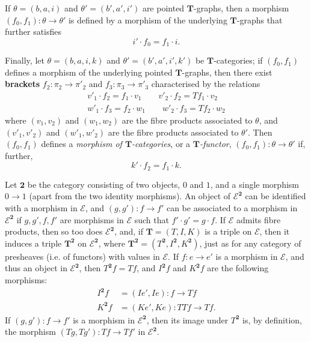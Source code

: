 \documentclass{article}
\newcommand{\oldpage}[1]{\marginpar{\footnotesize$\Big\vert$ \textit{p.~#1}}}
\newcommand{\unsure}[1]{{\color{purple}\textbf{#1}}}
\newcommand{\TT}{\mathbf{T}}
\newcommand{\cat}[1]{\mathcal{#1}}
\begin{document}
If $\theta=(b,a,i)$ and $\theta'=(b',a',i')$ are pointed $\TT$-graphs, then a morphism $(f_0,f_1)\colon\theta\to\theta'$ is defined by a morphism of the underlying $\TT$-graphs that further satisfies
\[
  i'\cdot f_0
  = f_1\cdot i.
  \tag{2'}
\]

\oldpage{228}
Finally, let $\theta=(b,a,i,k)$ and $\theta'=(b',a',i',k')$ be $\TT$-categories;
if $(f_0,f_1)$ defines a morphism of the underlying pointed $\TT$-graphs, then there exist \unsure{brackets} $f_2\colon\pi_2\to\pi'_2$ and $f_3\colon\pi_3\to\pi'_3$ characterised by the relations
\[
  \begin{gathered}
    v'_1\cdot f_2
    = f_1\cdot v_1
    \qquad
    v'_2\cdot f_2
    = Tf_1\cdot v_2
  \\w'_1\cdot f_3
    = f_2\cdot w_1
    \qquad
    w'_2\cdot f_3
    = T f_2\cdot w_2
  \end{gathered}
\]
where $(v_1,v_2)$ and $(w_1,w_2)$ are the fibre products associated to $\theta$, and $(v'_1,v'_2)$ and $(w'_1,w'_2)$ are the fibre products associated to $\theta'$.
Then $(f_0,f_1)$ defines a \emph{morphism of $\TT$-categories}, or a \emph{$\TT$-functor}, $(f_0,f_1)\colon\theta\to\theta'$ if, further,
\[
  k'\cdot f_2
  = f_1\cdot k.
  \tag{3'}
\]

Let $\mathbf{2}$ be the category consisting of two objects, $0$ and $1$, and a single morphism $0\to1$ (apart from the two identity morphisms).
An object of $\cat{E}^\mathbf{2}$ can be identified with a morphism in $\cat{E}$, and $(g,g')\colon f\to f'$ can be associated to a morphism in $\cat{E}^\mathbf{2}$ if $g,g',f,f'$ are morphisms in $\cat{E}$ such that $f'\cdot g'=g\cdot f$.
If $\cat{E}$ admits fibre products, then so too does $\cat{E}^\mathbf{2}$, and, if $\TT=(T,I,K)$ is a triple on $\cat{E}$, then it induces a triple $\TT^\mathbf{2}$ on $\cat{E}^\mathbf{2}$, where $\TT^\mathbf{2}=(T^\mathbf{2},I^\mathbf{2},K^\mathbf{2})$, just as for any category of presheaves (i.e. of functors) with values in $\cat{E}$.
If $f\colon e\to e'$ is a morphism in $\cat{E}$, and thus an object in $\cat{E}^\mathbf{2}$, then $T^\mathbf{2}f=Tf$, and $I^\mathbf{2}f$ and $K^\mathbf{2}f$ are the following morphisms:
\[
  \begin{aligned}
    I^\mathbf{2}f
    &= (Ie',Ie)
    \colon f
    \to Tf
  \\K^\mathbf{2}f
    &= (Ke', Ke)
    \colon TTf
    \to Tf.
  \end{aligned}
\]
If $(g,g')\colon f\to f'$ is a morphism in $\cat{E}^\mathbf{2}$, then its image under $T^\mathbf{2}$ is, by definition, the morphism $(Tg,Tg')\colon Tf\to Tf'$ in $\cat{E}^\mathbf{2}$.
\end{document}
